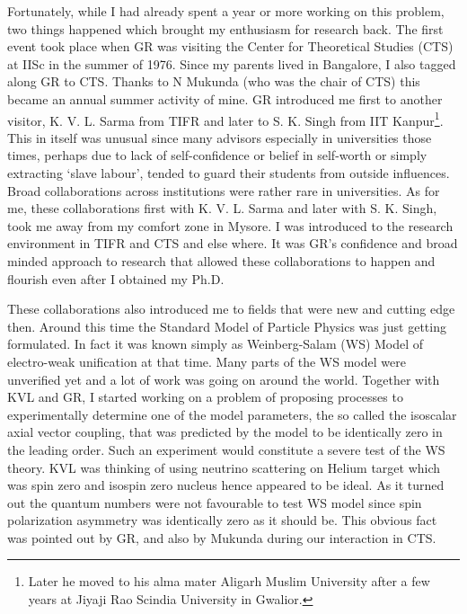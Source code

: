 Fortunately, while I had already spent a year or more working on this problem, two things happened which brought my enthusiasm for research back. The first event took place when GR was visiting the Center for Theoretical Studies (CTS) at IISc in the summer of 1976. Since my parents lived in Bangalore, I also tagged along GR to CTS. Thanks to N Mukunda (who was the chair of CTS) this became an annual summer activity of mine. GR introduced me first to another visitor, K. V. L. Sarma from TIFR and later to S. K. Singh from IIT Kanpur\footnote{Later he moved to his alma mater Aligarh Muslim University after a few years at Jiyaji Rao Scindia University in Gwalior.}. This in itself was unusual since many advisors especially in universities those times, perhaps due to lack of self-confidence or belief in self-worth or simply extracting ‘slave labour’, tended to guard their students from outside influences. Broad collaborations across institutions were rather rare in universities. As for me, these collaborations first with K. V. L. Sarma and later with S. K. Singh, took me away from my comfort zone in Mysore. I was introduced to the research environment in TIFR and CTS and else where. It was GR’s confidence and broad minded approach to research that allowed these collaborations to happen and flourish even after I obtained my Ph.D.

These collaborations also introduced me to fields that were new and cutting edge then. Around this time the Standard Model of Particle Physics was just getting formulated. In fact it was known simply as Weinberg-Salam (WS) Model of electro-weak unification at that time. Many parts of the WS model were unverified yet and a lot of work was going on around the world. Together with KVL and GR, I started working on a problem of proposing processes to experimentally determine one of the model parameters, the so called the isoscalar axial vector coupling, that was predicted by the model to be identically zero in the leading order. Such an experiment would constitute a severe test of the WS theory. KVL was thinking of using neutrino scattering on Helium target which was spin zero and isospin zero nucleus hence appeared to be ideal. As it turned out the quantum numbers were not favourable to test WS model since spin polarization asymmetry was identically zero as it should be. This obvious fact was pointed out by GR, and also by Mukunda during our interaction in CTS.
\medskip

